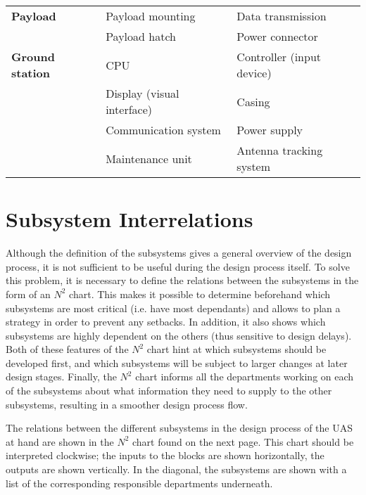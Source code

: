 \begin{table}[h]
\begin{tabular}{lll}
\textbf{Payload}        & Payload mounting           & Data transmission             \\
\textbf{}               & Payload hatch              & Power connector               \\\hdashline
\textbf{Ground station} & CPU                        & Controller (input device)            \\
\textbf{}               & Display (visual interface) & Casing                        \\
                        & Communication system       & Power supply                  \\
                        & Maintenance unit           & Antenna tracking system       \\\bottomrule
\end{tabular}
\end{table}

\section{Subsystem Interrelations}
\label{sec:inter}

Although the definition of the subsystems gives a general overview of the design process, it is not sufficient to be useful during the design process itself. To solve this problem, it is necessary to define the relations between the subsystems in the form of an $N^{2}$ chart. This makes it possible to determine beforehand which subsystems are most critical (i.e. have most dependants) and allows to plan a strategy in order to prevent any setbacks. In addition, it also shows which subsystems are highly dependent on the others (thus sensitive to design delays). Both of these features of the $N^{2}$ chart hint at which subsystems should be developed first, and which subsystems will be subject to larger changes at later design stages. Finally, the $N^{2}$ chart informs all the departments working on each of the subsystems about what information they need to supply to the other subsystems, resulting in a smoother design process flow.


The relations between the different subsystems in the design process of the UAS at hand are shown in the $N^{2}$ chart found on the next page. This chart should be interpreted clockwise; the inputs to the blocks are shown horizontally, the outputs are shown vertically. In the diagonal, the subsystems are shown with a list of the corresponding responsible departments underneath.

